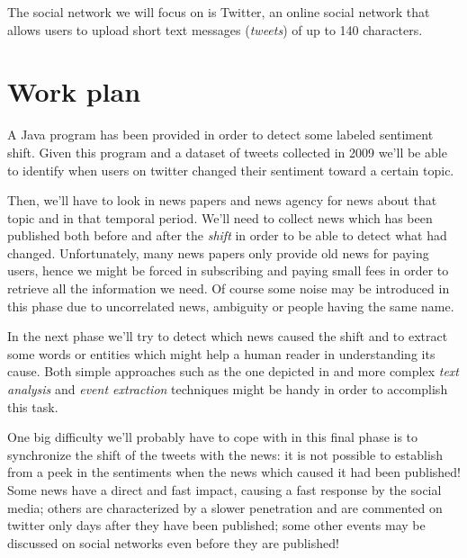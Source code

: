 \documentclass[a4paper]{article}
\begin{document}
The social network we will focus on is Twitter, an online social network that
allows users to upload short text messages (\emph{tweets}) of up to 140 characters.

\section{Work plan}
A Java program has been provided in order to detect some labeled sentiment
shift. Given this program and a dataset of tweets collected in 2009 we'll be
able to identify when users on twitter changed their sentiment toward a certain
topic.

Then, we'll have to look in news papers and news agency for news about that
topic and in that temporal period. We'll need to collect news which has been
published both before and after the \emph{shift} in order to be able to detect
what had changed. 
Unfortunately, many news papers only provide old news for
paying users, hence we might be forced in subscribing and paying small fees in
order to retrieve all the information we need. 
Of course some noise may be introduced in this phase due to uncorrelated news,
ambiguity or people having the same name.

In the next phase we'll try to detect which news caused the shift and to extract
some words or entities which might help a human reader in understanding its
cause. Both simple approaches such as the one depicted in \cite{Bifet} and more
complex \emph{text analysis} and \emph{event extraction} techniques might be
handy in order to accomplish this task.

One big difficulty we'll probably have to cope with in this final phase is to
synchronize the shift of the tweets with the news: it is not possible to
establish from a peek in the sentiments when the news which caused it had been
published! Some news have a direct and fast impact, causing a fast
response by the social media; others are characterized by a slower penetration
and are commented on twitter only days after they have been published; some
other events may be discussed on social networks even before they are
published!
\end{document}
